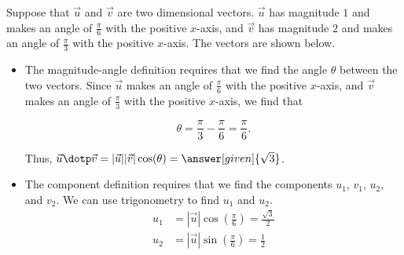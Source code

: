 \documentclass{ximera}
\begin{document}
\begin{example}
Suppose that $\vec{u}$ and $\vec{v}$ are two dimensional vectors.  $\vec{u}$ has magnitude $1$ and makes an angle of $\frac{\pi}{6}$ with the positive $x$-axis, and  $\vec{v}$ has magnitude $2$ and makes an angle of $\frac{\pi}{3}$ with the positive $x$-axis. The vectors are shown below.

\begin{image}
\end{image}

\begin{itemize}
\item The magnitude-angle definition requires that we find the angle $\theta$ between the two vectors.  Since  $\vec{u}$  makes an angle of $\frac{\pi}{6}$ with the positive $x$-axis, and  $\vec{v}$ makes an angle of $\frac{\pi}{3}$ with the positive $x$-axis, we find that 

\[
\theta = \frac{\pi}{3}-\frac{\pi}{6} = \frac{\pi}{6}.
\]

Thus, $\vec{u} \dotp \vec{v} = |\vec{u}||\vec{v}| \cos(\theta) = \answer[given]{\sqrt{3}}$.

\item The component definition requires that we find the components $u_1$, $v_1$, $u_2$, and $v_2$.  We can use trigonometry to find  $u_1$ and $u_2$.
\begin{align*}
u_1 &= |\vec{u}|\cos\left(\frac{\pi}{6}\right) =\frac{\sqrt{3}}{2} \\
u_2 &= |\vec{u}|\sin\left(\frac{\pi}{6}\right) =\frac{1}{2} \\
\end{align*}


\end{itemize}
\end{example}
\end{document}
